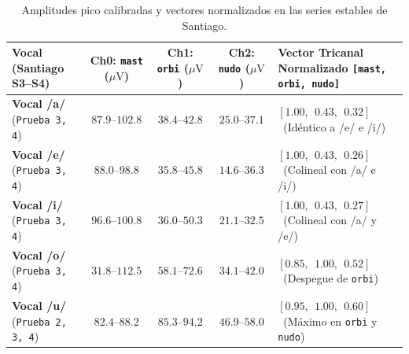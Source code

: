 \documentclass[11pt,a4paper]{article}
\begin{document}
\begin{table}[H]
\centering
\small
\begin{tabularx}{\textwidth}{l c c c X}
\toprule
\textbf{Vocal (Santiago S3--S4)} & \textbf{Ch0: \texttt{mast}} ($\mu\text{V}$) & \textbf{Ch1: \texttt{orbi}} ($\mu\text{V}$) & \textbf{Ch2: \texttt{nudo}} ($\mu\text{V}$) & \textbf{Vector Tricanal Normalizado \texttt{[mast, orbi, nudo]}} \\
\midrule
\textbf{Vocal /a/} (\texttt{Prueba 3, 4}) & $\mathbf{87.9\text{--}102.8}$ & $38.4\text{--}42.8$ & $25.0\text{--}37.1$ & $\mathbf{[1.00,\ \ 0.43,\ \ 0.32]}$ \ (Idéntico a /e/ e /i/) \\
\textbf{Vocal /e/} (\texttt{Prueba 3, 4}) & $\mathbf{88.0\text{--}98.8}$  & $35.8\text{--}45.8$ & $14.6\text{--}36.3$ & $\mathbf{[1.00,\ \ 0.43,\ \ 0.26]}$ \ (Colineal con /a/ e /i/) \\
\textbf{Vocal /i/} (\texttt{Prueba 3, 4}) & $\mathbf{96.6\text{--}100.8}$ & $36.0\text{--}50.3$ & $21.1\text{--}32.5$ & $\mathbf{[1.00,\ \ 0.43,\ \ 0.27]}$ \ (Colineal con /a/ y /e/) \\
\midrule
\textbf{Vocal /o/} (\texttt{Prueba 3, 4}) & $31.8\text{--}112.5$ & $\mathbf{58.1\text{--}72.6}$ & $34.1\text{--}42.0$ & $\mathbf{[0.85,\ \ 1.00,\ \ 0.52]}$ \ (Despegue de \texttt{orbi}) \\
\textbf{Vocal /u/} (\texttt{Prueba 2, 3, 4}) & $82.4\text{--}88.2$ & $\mathbf{85.3\text{--}94.2}$ & $\mathbf{46.9\text{--}58.0}$ & $\mathbf{[0.95,\ \ 1.00,\ \ 0.60]}$ \ (Máximo en \texttt{orbi} y \texttt{nudo}) \\
\bottomrule
\end{tabularx}
\caption{Amplitudes pico calibradas y vectores normalizados en las series estables de Santiago.}
\label{tab:vectores_santi}
\end{table}
\end{document}
